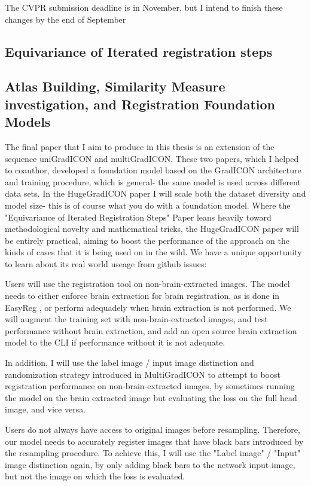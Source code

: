 \documentclass{article}
\begin{document}
The CVPR submission deadline is in November, but I intend to finish these changes by the end of September

\subsection{Equivariance of Iterated registration steps}




\subsection{Atlas Building, Similarity Measure investigation, and Registration Foundation Models}

The final paper that I aim to produce in this thesis is an extension of the sequence uniGradICON and multiGradICON. These two papers, which I helped to coauthor, developed a foundation model based on the GradICON architecture and training procedure, which is general- the same model is used across different data sets. In the HugeGradICON paper I will scale both the dataset diversity and model size- this is of course what you do with a foundation model. Where the "Equivariance of Iterated Registration Steps" Paper leans heavily toward methodological novelty and mathematical tricks, the HugeGradICON paper will be entirely practical, aiming to boost the performance of the approach on the kinds of cases that it is being used on in the wild. We have a unique opportunity to learn about its real world useage from github issues:

Users will use the registration tool on non-brain-extracted images. The model needs to either enforce brain extraction for brain registration, as is done in EasyReg \cite{easyReg}, or perform adequadely when brain extraction is not performed. We will augment the training set with non-brain-extracted images, and test performance without brain extraction, and add an open source brain extraction model to the CLI if performance without it is not adequate.

In addition, I will use the label image / input image distinction and randomization strategy introduced in MultiGradICON to attempt to boost registration performance on non-brain-extracted images, by sometimes running the model on the brain extracted image but evaluating the loss on the full head image, and vice versa.

Users do not always have access to original images before resampling. Therefore, our model needs to accurately register images that have black bars introduced by the resampling procedure. To achieve this, I will use the "Label image" / "Input" image distinction again, by only adding black bars to the network input image, but not the image on which the loss is evaluated.
\end{document}
